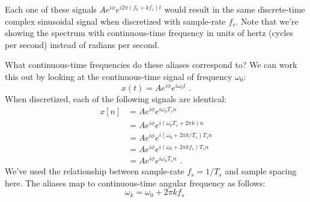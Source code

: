 \begin{marginfigure}[5cm]
  \begin{center}
  \end{center}
  \caption{Each one of these signals $Ae^{i\phi}e^{i2\pi (f_0 + k f_s)t}$
  would result in the same discrete-time complex sinusoidal signal
  when discretized with sample-rate $f_s$. Note that we're showing the
  spectrum with continuous-time frequency in units of hertz (cycles
  per second) instead of radians per second.}
\end{marginfigure}

What continuous-time frequencies do these aliases correspond to? We
can work this out by looking at the continuous-time signal of
frequency $\omega_0$:
\begin{equation}
  x(t) = A e^{i\phi} e^{i\omega_0 t}\,\,.
\end{equation}
When discretized, each of the following signals are identical:
\begin{align}
  x[n] & =A e^{i\phi} e^{i \omega_0 T_s n }                \\
       & = A e^{i\phi} e^{i(\omega_0 T_s + 2\pi k) n }     \\
       & = A e^{i\phi} e^{i(\omega_0 + 2\pi k/T_s) T_s n } \\
       & = A e^{i\phi} e^{i(\omega_0 + 2\pi k f_s) T_s n } \\
       & = A e^{i\phi} e^{i \omega_k T_s n } \,\,.
\end{align}
We've used the relationship between sample-rate $f_s=1/T_s$ and sample
spacing here. The aliases map to continuous-time angular frequency as
follows:
\begin{equation}
  \boxed{
    \omega_k = \omega_0 + 2\pi k f_s
  }\,\,
\end{equation}

